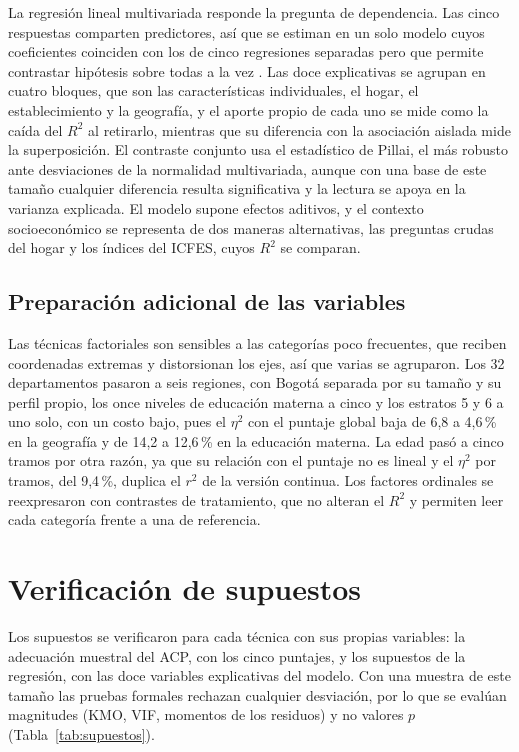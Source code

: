 \documentclass[12pt]{article}
\begin{document}
La regresión lineal multivariada responde la pregunta de dependencia. Las cinco respuestas
comparten predictores, así que se estiman en un solo modelo cuyos coeficientes coinciden con los
de cinco regresiones separadas pero que permite contrastar hipótesis sobre todas a la vez
\parencite{diaz2012}. Las doce explicativas se agrupan en cuatro bloques, que son las
características individuales, el hogar, el establecimiento y la geografía, y el aporte propio de
cada uno se mide como la caída del $R^2$ al retirarlo, mientras que su diferencia con la
asociación aislada mide la superposición. El contraste conjunto usa el estadístico de Pillai, el
más robusto ante desviaciones de la normalidad multivariada, aunque con una base de este tamaño
cualquier diferencia resulta significativa y la lectura se apoya en la varianza explicada. El
modelo supone efectos aditivos, y el contexto socioeconómico se representa de dos maneras
alternativas, las preguntas crudas del hogar y los índices del ICFES, cuyos $R^2$ se comparan.

\subsection{Preparación adicional de las variables}

Las técnicas factoriales son sensibles a las categorías poco frecuentes, que reciben coordenadas
extremas y distorsionan los ejes, así que varias se agruparon. Los 32 departamentos pasaron a
seis regiones, con Bogotá separada por su tamaño y su perfil propio, los once niveles de educación
materna a cinco y los estratos 5 y 6 a uno solo, con un costo bajo, pues el $\eta^2$ con el
puntaje global baja de 6,8 a 4,6\,\% en la geografía y de 14,2 a 12,6\,\% en la educación
materna. La edad pasó a cinco tramos por otra razón, ya que su relación con el puntaje no es
lineal y el $\eta^2$ por tramos, del 9,4\,\%, duplica el $r^2$ de la versión continua. Los factores
ordinales se reexpresaron con contrastes de tratamiento, que no alteran el $R^2$ y permiten leer
cada categoría frente a una de referencia.

\vspace{0.1cm}

\section{Verificación de supuestos}
\label{sec:supuestos}

Los supuestos se verificaron para cada técnica con sus propias variables: la adecuación muestral del
ACP, con los cinco puntajes, y los supuestos de la regresión, con las doce
variables explicativas del modelo. Con una muestra de este tamaño las pruebas
formales rechazan cualquier desviación, por lo que se evalúan magnitudes (KMO, VIF, momentos de los
residuos) y no valores $p$ (Tabla~\ref{tab:supuestos}).
\end{document}

